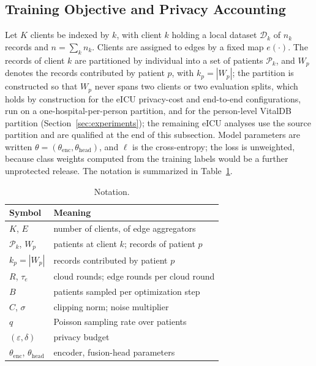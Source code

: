 \subsection{Training Objective and Privacy Accounting}
\label{sec:method:objective}

Let $K$ clients be indexed by $k$, with client $k$ holding a local dataset
$\mathcal{D}_k$ of $n_k$ records and $n = \sum_k n_k$. Clients are assigned to
edges by a fixed map $e(\cdot)$. The records of client $k$ are partitioned by
individual into a set of patients $\mathcal{P}_k$, and $W_p$ denotes the
records contributed by patient $p$, with $k_p = |W_p|$; the partition is
constructed so that $W_p$ never spans two clients or two evaluation splits,
which holds by construction for the eICU privacy-cost and end-to-end
configurations, run on a one-hospital-per-person partition, and for the
person-level VitalDB partition (Section~\ref{sec:experiments}); the remaining
eICU analyses use the source partition and are qualified at the end of this subsection.
Model parameters are written $\theta = (\theta_{\mathrm{enc}},
\theta_{\mathrm{head}})$, and $\ell$ is the cross-entropy; the loss is unweighted, because class
weights computed from the training labels would be a further unprotected
release. The
notation is summarized in Table~\ref{tab:notation}.

\begin{table}[!t]
\centering
\caption{Notation.}
\label{tab:notation}
\begin{tabular}{ll}
\toprule
Symbol & Meaning \\
\midrule
$K$, $E$              & number of clients, of edge aggregators \\
$\mathcal{P}_k$, $W_p$ & patients at client $k$; records of patient $p$ \\
$k_p = |W_p|$         & records contributed by patient $p$ \\
$R$, $\tau_e$         & cloud rounds; edge rounds per cloud round \\
$B$                   & patients sampled per optimization step \\
$C$, $\sigma$         & clipping norm; noise multiplier \\
$q$                   & Poisson sampling rate over patients \\
$(\varepsilon,\delta)$ & privacy budget \\
$\theta_{\mathrm{enc}}$, $\theta_{\mathrm{head}}$ & encoder, fusion-head parameters \\
\bottomrule
\end{tabular}
\end{table}

